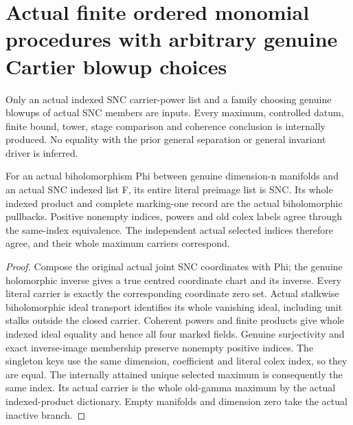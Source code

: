 \section{Actual finite ordered monomial procedures with arbitrary genuine Cartier blowup choices}

Only an actual indexed SNC carrier-power list and a family choosing genuine
blowups of actual SNC members are inputs. Every maximum, controlled datum,
finite bound, tower, stage comparison and coherence conclusion is internally
produced. No equality with the prior general separation or general invariant
driver is inferred.

\begin{lemma}
\label{hir:nc-ordered-choice-whole-biholomorphic-dictionary}
\leanok
For an actual biholomorphism Phi between genuine dimension-n manifolds and
an actual SNC indexed list F, its entire literal preimage list is SNC. Its
whole indexed product and complete marking-one record are the actual
biholomorphic pullbacks. Positive nonempty indices, powers and old colex
labels agree through the same-index equivalence. The independent actual
selected indices therefore agree, and their whole maximum carriers correspond.
\end{lemma}
\begin{proof}
Compose the original actual joint SNC coordinates with Phi; the genuine
holomorphic inverse gives a true centred coordinate chart and its inverse.
Every literal carrier is exactly the corresponding coordinate zero set.
Actual stalkwise biholomorphic ideal transport identifies its whole vanishing
ideal, including unit stalks outside the closed carrier. Coherent powers
and finite products give whole indexed ideal equality and hence all four
marked fields. Genuine surjectivity and exact inverse-image membership
preserve nonempty positive indices. The singleton keys use the same dimension,
coefficient and literal colex index, so they are equal. The internally attained
unique selected maximum is consequently the same index. Its actual carrier
is the whole old-gamma maximum by the actual indexed-product dictionary.
Empty manifolds and dimension zero take the actual inactive branch.
\end{proof}

